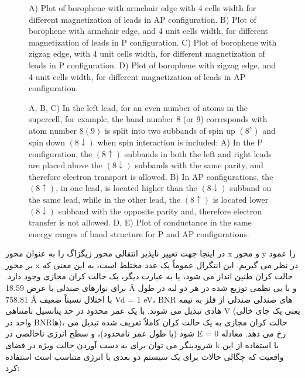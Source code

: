     \begin{figure}[ht]
        \centering
        \resizebox{0.45\textwidth}{!}{}
        \resizebox{0.45\textwidth}{!}{}
        \resizebox{0.45\textwidth}{!}{}
        \resizebox{0.45\textwidth}{!}{}
        \caption{A) Plot of borophene with armchair edge with 4 cells width for different magnetization of leads in AP configuration. B) Plot of borophene with armchair edge, and 4 unit cells width, for different magnetization of leads in P configuration. C) Plot of borophene with zigzag edge, with 4 unit cells width, for different magnetization of leads in P configuration. D) Plot of borophene with zigzag edge, and 4 unit cells width, for different magnetization of leads in AP configuration.}
        \label{fig:conductance}
    \end{figure}
    \begin{figure}[ht]
        \centering
        \resizebox{0.32\textwidth}{!}{}
        \resizebox{0.32\textwidth}{!}{}
        \resizebox{0.32\textwidth}{!}{}
        \resizebox{0.45\textwidth}{!}{}
        \resizebox{0.45\textwidth}{!}{}
        \caption{A, B, C) In the left lead, for an even number of atoms in the supercell, for example, the band number 8 (or 9) corresponds with atom number $8(9)$ is split into two subbands of spin up $(8^\uparrow)$ and spin down $(8\downarrow)$ when spin interaction is included: A) In the P configuration, the $(8\uparrow)$ subbands in both the left and right leads are placed above the $(8\downarrow)$ subbands with the same parity, and therefore electron transport is allowed. B) In AP configurations, the $(8\uparrow)$, in one lead, is located higher than the $(8\downarrow)$ subband on the same lead, while in the other lead, the $(8\uparrow)$ is located lower $(8\downarrow)$ subband with the opposite parity and, therefore electron transfer is not allowed. D, E) Plot of conductance in the same energy ranges of band structure for P and AP configurations.}
        \label{fig:bandconductance}
    \end{figure}
در اینجا جهت تغییر ناپذیر انتقالی محور زیگزاگ را به عنوان محور x و محور y را عمود بر محور x در نظر می گیریم. این انتگرال عموماً یک عدد مختلط است، به این معنی که حالت کران طنین انداز می شود، یا به عبارت دیگر، یک حالت کران مجازی وجود دارد. برای نوارهای صندلی با عرض 18.59 Å و با بی نظمی توزیع شده در هر دو لبه در طول 758.81 Å با اختلال نسبتاً ضعیف Vd = 1 eV، BNR های صندلی صندلی از فلز به نیمه هادی تبدیل می شوند. با یک عمر محدود در حد پتانسیل نامتناهی V (یعنی یک جای خالی واحد در BNRها)، حالت کران مجازی به یک حالت کران کاملاً تعریف شده تبدیل می شود (با طول عمر نامحدود)، و سطح انرژی ناخالصی در E = 0 رخ می دهد. معادله شرودینگر می توان برای به دست آوردن حالت ویژه در فضای k با استفاده از این واقعیت که چگالی حالات برای یک سیستم دو بعدی با انرژی متناسب است استفاده کرد:
